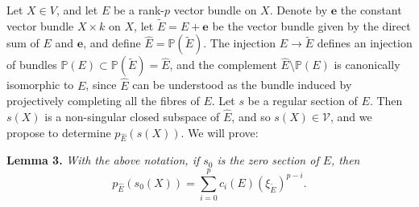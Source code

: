 \documentclass{article}
\newenvironment{itenv}[1]
  {\phantomsection\par\medskip\noindent\textbf{#1.}\itshape}
  {\medskip}
\renewcommand{\cal}[1]{{\mathcal{#1}}}
\newcommand{\oldpage}[1]{\marginpar{\footnotesize$\Big\vert$ \textit{p.~#1}}}
\begin{document}
\oldpage{152}
Let $X\in V$, and let $E$ be a rank-$p$ vector bundle on $X$.
Denote by $\mathbf{e}$ the constant vector bundle $X\times k$ on $X$, let $\widetilde{E}=E+\mathbf{e}$ be the vector bundle given by the direct sum of $E$ and $\mathbf{e}$, and define $\widehat{E}=\mathbb{P}(\widetilde{E})$.
The injection $E\to\widetilde{E}$ defines an injection of bundles $\mathbb{P}(E)\subset\mathbb{P}(\widetilde{E})=\widehat{E}$, and the complement $\widehat{E}\setminus\mathbb{P}(E)$ is canonically isomorphic to $E$, since $\widehat{E}$ can be understood as the bundle induced by projectively completing all the fibres of $E$.
Let $s$ be a regular section of $E$.
Then $s(X)$ is a non-singular closed subspace of $\widehat{E}$, and so $s(X)\in\cal{V}$, and we propose to determine $p_{\widehat{E}}(s(X))$.
We will prove:

\begin{itenv}{Lemma 3}
\label{lemma3}
  With the above notation, if $s_0$ is the zero section of $E$, then
  \[
  \label{equation17}
    p_{\widehat{E}}(s_0(X)) = \sum_{i=0}^p c_i(E)(\xi_{\widetilde{E}})^{p-i}.
  \tag{17}
  \]
\end{itenv}
\end{document}
